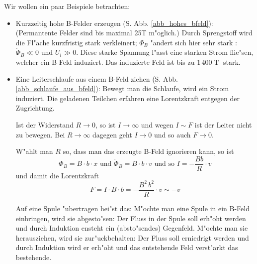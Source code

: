 \abs
\begin{Beispiel}
Wir wollen ein paar Beispiele betrachten:
   \begin{itemize}
   \item Kurzzeitig hohe B-Felder erzeugen
      (S. Abb. \ref{abb_hohes_bfeld}): (Permantente Felder sind bis
      maximal 25T m"oglich.) Durch Sprengstoff wird die Fl"ache
      kurzfristig stark verkleinert; $\Phi_B$ "andert sich hier sehr
      stark : $\dot \Phi_B \ll 0$ und $U_i \gg 0$. Diese starke
      Spannung l"asst eine starken Strom flie"sen, welcher ein B-Feld
      induziert. Das induzierte Feld ist bis zu $1\, 400
      \operatorname{T}$ stark.
   \item Eine Leiterschlaufe aus einem B-Feld ziehen
      (S. Abb. \ref{abb_schlaufe_aus_bfeld}): Bewegt man die Schlaufe,
      wird ein Strom induziert. Die geladenen Teilchen erfahren eine
      Lorentzkraft entgegen der Zugrichtung.

      Ist der Widerstand $R \to 0$, so ist $I \to \infty$ und wegen $I
      \sim F$ ist der Leiter nicht zu bewegen. Bei $R \to \infty$
      dagegen geht $I\to 0$ und so auch $F \to 0$.

      W"ahlt man $R$ so, dass man das erzeugte B-Feld ignorieren kann,
      so ist
      \begin{equation*}
         \Phi_B = B \cdot b \cdot x  \text{ und } \dot \Phi_B = B
         \cdot b \cdot v \text{ und so } I = -\frac{B  b }{R} \cdot v
      \end{equation*}
      und damit die Lorentzkraft
      \begin{equation*}
         F = I \cdot B \cdot b = - \frac{B^2 \, b^2 }{R}\cdot v \sim - v
      \end{equation*}

Auf eine Spule "ubertragen hei"st das: M"ochte man eine Spule in ein
B-Feld einbringen, wird sie abgesto"sen: Der Fluss in der Spule soll
erh"oht werden und durch Induktion ensteht ein (absto"sendes)
Gegenfeld. M"ochte man sie herausziehen,
wird sie zur"uckbehalten: Der Fluss soll erniedrigt werden und durch
Induktion wird er erh"oht und das entstehende Feld verst"arkt das bestehende.


\end{itemize}
\end{Beispiel}
